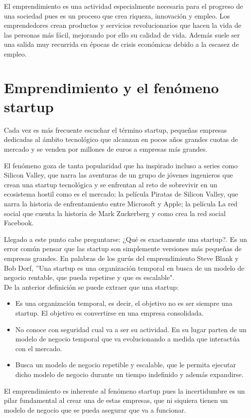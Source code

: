 El emprendimiento es una actividad especialmente necesaria para el progreso de una sociedad pues es un proceso que crea riqueza, innovación y empleo. Los emprendedores crean productos y servicios revolucionarios que hacen la vida de las personas más fácil, mejorando por ello su calidad de vida. Además suele ser una salida muy recurrida en épocas de crisis económicas debido a la escasez de empleo.

\section{Emprendimiento y el fenómeno startup}

Cada vez es más frecuente escuchar el término startup, pequeñas empresas dedicadas al ámbito tecnológico que alcanzan en pocos años grandes cuotas de mercado y se venden por millones de euros a empresas más grandes.

 El fenómeno goza de tanta popularidad que ha inspirado incluso a series como Silicon Valley, que narra las aventuras de un grupo de jóvenes ingenieros que crean una startup tecnológica y se enfrentan al reto de sobrevivir en un ecosistema hostil como es el mercado; la película Piratas de Silicon Valley, que narra la historia de enfrentamiento entre Microsoft y Apple; la película La red social que cuenta la historia de Mark Zuckerberg y como crea la red social Facebook.

Llegado a este punto cabe preguntarse: ¿Qué es exactamente una startup?. Es un error común pensar que las startup son simplemente versiones más pequeñas de empresas grandes. En palabras de los gurús del emprendimiento Steve Blank y Bob Dorf, ''Una startup es una organización temporal en busca de un modelo de negocio rentable, que pueda repetirse y que es escalable"\cite{steveblankbobdorf2013}.\\
De la anterior definición se puede extraer que una startup:
\begin{itemize}
	\item Es una organización temporal, es decir, el objetivo no es ser siempre una startup. El objetivo es convertirse en una empresa consolidada.
	\item No conoce con seguridad cual va a ser su actividad. En su lugar parten de un modelo de negocio temporal que va evolucionando a medida que interactúa con el mercado.
	\item Busca un modelo de negocio repetible y escalable, que le permita ejecutar dicho modelo de negocio durante un tiempo indefinido y además expandirse.
\end{itemize}
El emprendimiento es inherente al fenómeno startup pues la incertidumbre es un pilar fundamental al crear una de estas empresas, que ni siquiera tienen un modelo de negocio que se pueda asegurar que va a funcionar.

